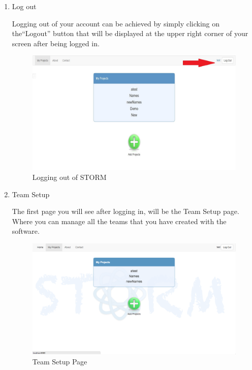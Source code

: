 \begin{enumerate}
\item Log out\par
Logging out of your account can be achieved by simply clicking on the``Logout'' button that will be displayed at the upper right corner of your screen after being logged in.
 \begin{figure}[H] 
	\centering
	\includegraphics[width=13cm]{./graphics/Logout.jpg}\par
	\caption{Logging out of STORM}
\end{figure}

\item Team Setup\par
The first page you will see after logging in, will be the Team Setup page.  Where you can manage all the teams that you have created with the software.\par
 \begin{figure}[H] 
	\centering
	\includegraphics[width=13cm]{./graphics/TeamSetup.jpg}\par
	\caption{Team Setup Page}
\end{figure}


\end{enumerate}
